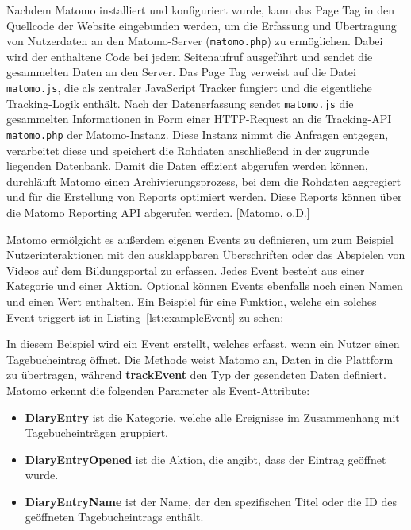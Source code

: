 Nachdem Matomo installiert und konfiguriert wurde, kann das Page Tag in den Quellcode der Website eingebunden werden, um die Erfassung und Übertragung von Nutzerdaten an den Matomo-Server (\texttt{matomo.php}) zu ermöglichen. Dabei wird der enthaltene Code bei jedem Seitenaufruf ausgeführt und sendet die gesammelten Daten an den Server. Das Page Tag verweist auf die Datei \texttt{matomo.js}, die als zentraler JavaScript Tracker fungiert und die eigentliche Tracking-Logik enthält. Nach der Datenerfassung sendet \texttt{matomo.js} die gesammelten Informationen in Form einer HTTP-Request an die Tracking-API \texttt{matomo.php} der Matomo-Instanz. Diese Instanz nimmt die Anfragen entgegen, verarbeitet diese und speichert die Rohdaten anschließend in der zugrunde liegenden Datenbank. Damit die Daten effizient abgerufen werden können, durchläuft Matomo einen Archivierungsprozess, bei dem die Rohdaten aggregiert und für die Erstellung von Reports optimiert werden. Diese Reports können über die Matomo Reporting API abgerufen werden. [Matomo, o.D.]

Matomo ermölgicht es außerdem eigenen Events zu definieren, um zum Beispiel Nutzerinteraktionen mit den ausklappbaren Überschriften oder das Abspielen von Videos auf dem Bildungsportal zu erfassen. Jedes Event besteht aus einer Kategorie und einer Aktion. Optional können Events ebenfalls noch einen Namen und einen Wert enthalten. Ein Beispiel für eine Funktion, welche ein solches Event triggert ist in Listing~\ref{lst:exampleEvent} zu sehen: 

\FloatBarrier


In diesem Beispiel wird ein Event erstellt, welches erfasst, wenn ein Nutzer einen Tagebucheintrag öffnet. Die Methode \texttt{} weist Matomo an, Daten in die Plattform zu übertragen, während \textbf{trackEvent} den Typ der gesendeten Daten definiert. Matomo erkennt die folgenden Parameter als Event-Attribute:

\begin{itemize}
    \item \textbf{DiaryEntry} ist die Kategorie, welche alle Ereignisse im Zusammenhang mit Tagebucheinträgen gruppiert.
    \item \textbf{DiaryEntryOpened} ist die Aktion, die angibt, dass der Eintrag geöffnet wurde.
    \item \textbf{DiaryEntryName} ist der Name, der den spezifischen Titel oder die ID des geöffneten Tagebucheintrags enthält.
\end{itemize}

